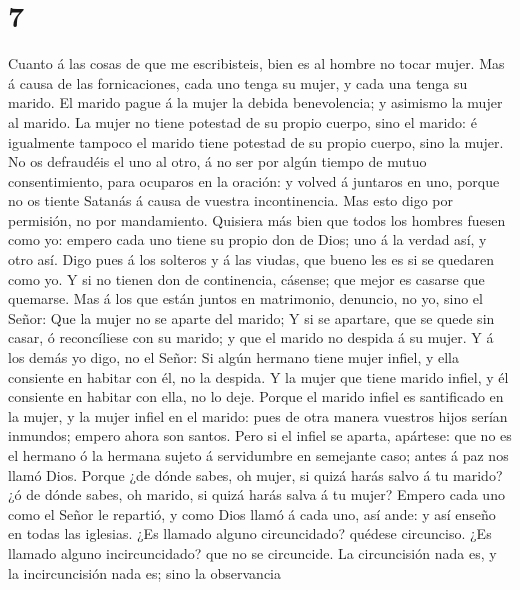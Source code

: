 \hypertarget{section-6}{%
\section{7}\label{section-6}}

 Cuanto á las cosas de que me escribisteis, bien es al
hombre no tocar mujer.  Mas á causa de las fornicaciones,
cada uno tenga su mujer, y cada una tenga su marido.  El
marido pague á la mujer la debida benevolencia; y asimismo la mujer al
marido.  La mujer no tiene potestad de su propio cuerpo,
sino el marido: é igualmente tampoco el marido tiene potestad de su
propio cuerpo, sino la mujer.  No os defraudéis el uno al
otro, á no ser por algún tiempo de mutuo consentimiento, para ocuparos
en la oración: y volved á juntaros en uno, porque no os tiente Satanás á
causa de vuestra incontinencia.  Mas esto digo por
permisión, no por mandamiento.  Quisiera más bien que todos
los hombres fuesen como yo: empero cada uno tiene su propio don de Dios;
uno á la verdad así, y otro así.  Digo pues á los solteros y
á las viudas, que bueno les es si se quedaren como yo.  Y si
no tienen don de continencia, cásense; que mejor es casarse que
quemarse.  Mas á los que están juntos en matrimonio,
denuncio, no yo, sino el Señor: Que la mujer no se aparte del marido;
 Y si se apartare, que se quede sin casar, ó reconcíliese
con su marido; y que el marido no despida á su mujer.  Y á
los demás yo digo, no el Señor: Si algún hermano tiene mujer infiel, y
ella consiente en habitar con él, no la despida.  Y la
mujer que tiene marido infiel, y él consiente en habitar con ella, no lo
deje.  Porque el marido infiel es santificado en la mujer,
y la mujer infiel en el marido: pues de otra manera vuestros hijos
serían inmundos; empero ahora son santos.  Pero si el
infiel se aparta, apártese: que no es el hermano ó la hermana sujeto á
servidumbre en semejante caso; antes á paz nos llamó Dios. 
Porque ¿de dónde sabes, oh mujer, si quizá harás salvo á tu marido? ¿ó
de dónde sabes, oh marido, si quizá harás salva á tu mujer?
 Empero cada uno como el Señor le repartió, y como Dios
llamó á cada uno, así ande: y así enseño en todas las iglesias.
 ¿Es llamado alguno circuncidado? quédese circunciso. ¿Es
llamado alguno incircuncidado? que no se circuncide.  La
circuncisión nada es, y la incircuncisión nada es; sino la observancia
